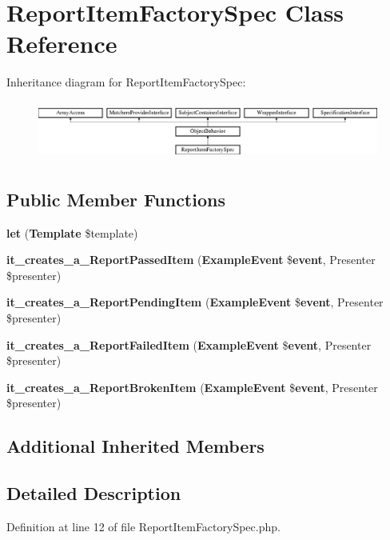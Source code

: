 \section{Report\+Item\+Factory\+Spec Class Reference}
\label{classspec_1_1_php_spec_1_1_formatter_1_1_html_1_1_report_item_factory_spec}
Inheritance diagram for Report\+Item\+Factory\+Spec\+:\begin{figure}[H]
\begin{center}
\leavevmode
\includegraphics[height=1.953488cm]{classspec_1_1_php_spec_1_1_formatter_1_1_html_1_1_report_item_factory_spec}
\end{center}
\end{figure}
\subsection*{Public Member Functions}
\begin{DoxyCompactItemize}
\item 
{\bf let} ({\bf Template} \$template)
\item 
{\bf it\+\_\+creates\+\_\+a\+\_\+\+Report\+Passed\+Item} ({\bf Example\+Event} \${\bf event}, Presenter \$presenter)
\item 
{\bf it\+\_\+creates\+\_\+a\+\_\+\+Report\+Pending\+Item} ({\bf Example\+Event} \${\bf event}, Presenter \$presenter)
\item 
{\bf it\+\_\+creates\+\_\+a\+\_\+\+Report\+Failed\+Item} ({\bf Example\+Event} \${\bf event}, Presenter \$presenter)
\item 
{\bf it\+\_\+creates\+\_\+a\+\_\+\+Report\+Broken\+Item} ({\bf Example\+Event} \${\bf event}, Presenter \$presenter)
\end{DoxyCompactItemize}
\subsection*{Additional Inherited Members}


\subsection{Detailed Description}


Definition at line 12 of file Report\+Item\+Factory\+Spec.\+php.



